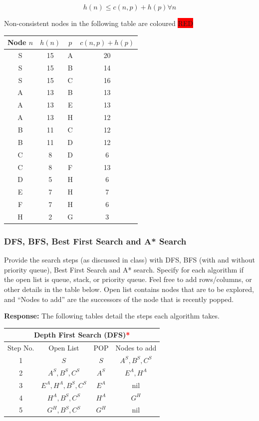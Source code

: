 \documentclass[12pt, letterpaper]{article}
\newcommand{\mybox}[1]{\par\noindent\colorbox{shadecolor}
{\parbox{\dimexpr\textwidth-2\fboxsep\relax}{#1}}}
\begin{document}
\[h(n) \leq c(n,p) + h(p) \forall n\]

Non-consistent nodes in the following table are coloured \colorbox{red}{RED}


\begin{center}
    \begin{tabular}{|c|c|c|c|} 
    \hline
    Node $n$ & $h(n)$ & $p$ & $c(n,p)+h(p)$ \tabularnewline
    \hline
    S & 15 & A & 20\tabularnewline
    \hline
    \rowcolor{red}S & 15 & B & 14\tabularnewline
    \hline
    S & 15 & C & 16\tabularnewline
    \hline
    A & 13 & B & 13\tabularnewline
    \hline
    A & 13 & E & 13\tabularnewline
    \hline
    \rowcolor{red}A & 13 & H & 12\tabularnewline
    \hline
    B & 11 & C & 12\tabularnewline
    \hline
    B & 11 & D & 12\tabularnewline
    \hline
    \rowcolor{red}C & 8 & D & 6\tabularnewline
    \hline
    C & 8 & F & 13\tabularnewline
    \hline
    D & 5 & H & 6\tabularnewline
    \hline
    E & 7 & H & 7\tabularnewline
    \hline
    \rowcolor{red}F & 7 & H & 6\tabularnewline
    \hline
    H & 2 & G & 3\tabularnewline
    \hline

    \end{tabular}
\end{center}

\subsubsection{DFS, BFS, Best First Search and A* Search}
\mybox{Provide the search steps (as discussed in class) with DFS, BFS (with and without priority
queue), Best First Search and A* search. Specify for each algorithm if the open list is
queue, stack, or priority queue. Feel free to add rows/columns, or other details in the
table below. Open list contains nodes that are to be explored, and “Nodes to add” are
the successors of the node that is recently popped.}

\textbf{Response:} The following tables detail the steps each algorithm takes.

\begin{center}
    \begin{tabular}{|c|c|c|c|}
    \hline
    \multicolumn{4}{|c|}{Depth First Search (\textbf{DFS})\textcolor{red}{*}}\\
    \hline
    Step No. & Open List & POP & Nodes to add \\ 
    \hline
    1 & $S$ & $S$ & $A^S, B^S, C^S$ \\
    \hline
    2 & $A^S, B^S, C^S$ & $A^S$ & $E^A,H^A$ \\
    \hline
    3 & $E^A, H^A, B^S, C^S$ & $E^A$ & nil \\
    \hline
    4 & $H^A, B^S, C^S$ & $H^A$ & $G^H$ \\
    \hline
    5 & $G^H,B^S,C^S$ & $G^H$ & nil \\
    \hline
    \end{tabular}
\end{center}
\end{document}
